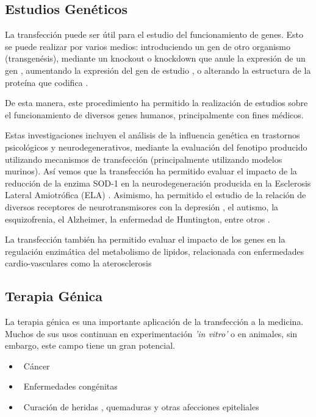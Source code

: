 \documentclass[fleqn,10pt]{SelfArx} %
\begin{document}
\subsection{Estudios Genéticos}

La transfección puede ser útil para el estudio del funcionamiento de genes. Esto se puede realizar por varios medios: introduciendo un gen de otro organismo (transgenésis), mediante un knockout o knockdown que anule la expresión de un gen \cite{cryanin2004}, aumentando la expresión del gen de estudio \cite{yanni2004laboratory}, o alterando la estructura de la proteína que codifica \cite{ripps1995transgenic}.

De esta manera, este procedimiento ha permitido la realización de estudios sobre el funcionamiento de diversos genes humanos, principalmente con fines médicos.

Estas investigaciones incluyen el análisis de la influencia genética en trastornos psicológicos y neurodegenerativos, mediante la evaluación del fenotipo producido utilizando mecanismos de transfección (principalmente utilizando modelos murinos). Así vemos que la transfección ha permitido evaluar el impacto de la reducción de la enzima SOD-1 en la neurodegeneración producida en la Esclerosis Lateral Amiotrófica (ELA) \cite{ripps1995transgenic}. Asimismo, ha permitido el estudio de la relación de diversos receptores de neurotransmisores con la depresión \cite{cryanin2004}, el autismo, la esquizofrenia, el Alzheimer, la enfermedad de Huntington, entre otros \cite{anthe2002}.

La transfección también ha permitido evaluar el impacto de los genes en la regulación enzimática del metabolismo de lipidos, relacionada con enfermedades cardio-vasculares como la aterosclerosis\cite{yanni2004laboratory}


\subsection{Terapia Génica}

La terapia génica es una importante aplicación de la transfección a la medicina. Muchos de sus usos continuan en experimentación \textit{'in vitro'} o en animales, sin embargo, este campo tiene un gran potencial.
\begin{itemize}[noitemsep] %
\item \ Cáncer
\item \ Enfermedades congénitas
\item \ Curación de heridas , quemaduras y otras afecciones epiteliales
\end{itemize}
\end{document}
